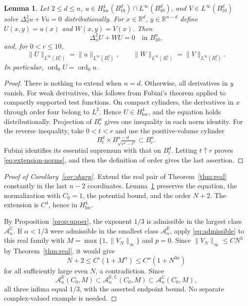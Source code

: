 \documentclass[11pt,twoside,leqno]{article}
\numberwithin{equation}{section}
\newtheorem{lemma}[theorem]{Lemma}
\theoremstyle{definition}
\theoremstyle{remark}
\newcommand{\R}{\mathbb R}
\newcommand{\C}{\mathbb C}
\newcommand{\ord}{\operatorname{ord}}
\newcommand{\loc}{\mathrm{loc}}
\begin{document}
\begin{lemma}\label{lem:extension}
Let $2\le d\le n$, $u\in H^4_{\loc}(B_{10}^d)\cap L^\infty(B_{10}^d)$,
and $V\in L^\infty(B_{10}^d)$ solve $\Delta_d^2u+Vu=0$
distributionally. For $x\in\R^d$, $y\in\R^{n-d}$ define
$U(x,y)=u(x)$ and $W(x,y)=V(x)$. Then
\[
 \Delta_n^2U+WU=0\quad\text{in }B_{10}^n,
\]
and, for $0<r\le10$,
\begin{equation}\label{eq:extension-norms}
 \|U\|_{L^\infty(B_r^n)}=\|u\|_{L^\infty(B_r^d)},\qquad
 \|W\|_{L^\infty(B_r^n)}=\|V\|_{L^\infty(B_r^d)}.
\end{equation}
In particular, $\ord_0U=\ord_0u$.
\end{lemma}
\begin{proof}
There is nothing to extend when $n=d$. Otherwise, all derivatives
in $y$ vanish. For weak derivatives, this follows from Fubini's
theorem applied to compactly supported test functions. On compact
cylinders, the derivatives in $x$ through order four belong to $L^2$.
Hence $U\in H^4_{\loc}$, and the equation holds distributionally.
Projection of $B_r^n$ gives one inequality in each norm identity.
For the reverse inequality, take $0<t<r$ and use the positive-volume
cylinder
\[
 B_t^d\times B_{\sqrt{r^2-t^2}}^{n-d}\subset B_r^n.
\]
Fubini identifies its essential supremum with that on $B_t^d$.
Letting $t\uparrow r$ proves \eqref{eq:extension-norms}, and then
the definition of order gives the last assertion.
\end{proof}

\begin{proof}[Proof of Corollary~\ref{cor:sharp}]
Extend the real pair of Theorem~\ref{thm:real} constantly in the last
$n-2$ coordinates. Lemma~\ref{lem:extension} preserves the equation,
the normalization with $C_0=1$, the potential bound, and the order
$N+2$. The extension is $C^4$, hence in $H^4_{\loc}$.

By Proposition~\ref{prop:upper}, the exponent $1/3$ is admissible in
the largest class $\mathcal A_n^{\C}$. If $\alpha<1/3$ were admissible in the
smallest class $\mathcal A_n^{\R}$, apply \eqref{eq:admissible}
to this real family with $M=\max\{1,\|V_N\|_\infty\}$ and $p=0$.
Since $\|V_N\|_\infty\le CN^3$ by Theorem~\ref{thm:real}, it would give
\[
 N+2\le C'(1+M^\alpha)\le C''(1+N^{3\alpha})
\]
for all sufficiently large even $N$, a contradiction. Since
\[
 \mathcal A_n^{\R}(C_0,M)
 \subset\mathcal A_n^{\R,\C}(C_0,M)
 \subset\mathcal A_n^{\C}(C_0,M),
\]
all three infima equal $1/3$, with the asserted endpoint bound.
No separate complex-valued example is needed.
\end{proof}
\end{document}
